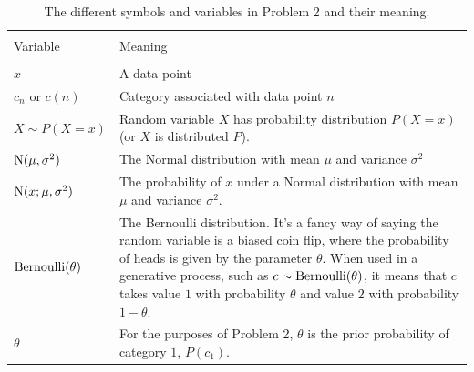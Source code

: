 \documentclass[11pt]{article}
\begin{document}
\begin{table}
\begin{center}
\begin{tabular}{|l|p{5in}|}
\hline \\
Variable & Meaning \\
\hline \hline \\
$x$ & A data point \\
$c_n$ or $c(n)$ & Category associated with data point $n$ \\
$X \sim P(X=x)$ & Random variable $X$ has probability distribution $P(X=x)$ (or $X$ is distributed $P$). \\
${\rm N}(\mu, \sigma^2)$ & The Normal distribution with mean $\mu$ and variance $\sigma^2$ \\
${\rm N}(x; \mu, \sigma^2)$ & The probability of $x$ under a Normal distribution with mean $\mu$ and variance $\sigma^2$.  \\
${\rm Bernoulli}(\theta)$ & The Bernoulli distribution. It's a fancy way of saying the random variable is a biased coin flip, where the probability of heads is given by the parameter $\theta$.  When used in a generative process, such as $c \sim {\rm Bernoulli}(\theta)$, it means that $c$ takes value $1$ with probability $\theta$ and value $2$ with probability $1-\theta$. \\
$\theta $ & For the purposes of Problem 2, $\theta$ is the prior probability of category $1$, $P(c_1)$. \\
\hline
\end{tabular}
\end{center}
\caption{The different symbols and variables in Problem 2 and their meaning.}
\end{table}
\end{document}
